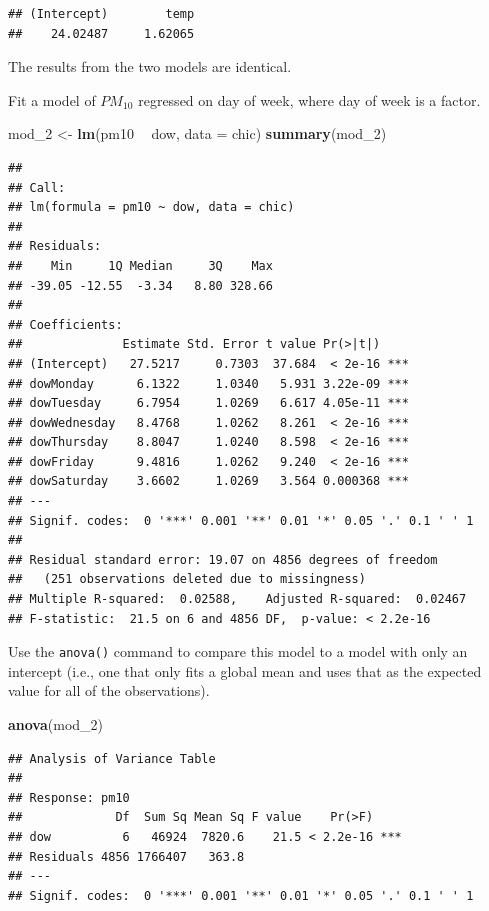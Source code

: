 \documentclass[]{book}
\makeatletter
\newenvironment{Shaded}{\begin{snugshade}}{\end{snugshade}}
\newcommand{\KeywordTok}[1]{\textcolor[rgb]{0.13,0.29,0.53}{\textbf{#1}}}
\newcommand{\DataTypeTok}[1]{\textcolor[rgb]{0.13,0.29,0.53}{#1}}
\newcommand{\DecValTok}[1]{\textcolor[rgb]{0.00,0.00,0.81}{#1}}
\newcommand{\StringTok}[1]{\textcolor[rgb]{0.31,0.60,0.02}{#1}}
\newcommand{\OperatorTok}[1]{\textcolor[rgb]{0.81,0.36,0.00}{\textbf{#1}}}
\newcommand{\NormalTok}[1]{#1}
\newenvironment{kframe}{%
\medskip{}
\setlength{\fboxsep}{.8em}
 \def\at@end@of@kframe{}%
 \ifinner\ifhmode%
  \def\at@end@of@kframe{\end{minipage}}%
  \begin{minipage}{\columnwidth}%
 \fi\fi%
 \def\FrameCommand##1{\hskip\@totalleftmargin \hskip-\fboxsep
 \colorbox{shadecolor}{##1}\hskip-\fboxsep
     \hskip-\linewidth \hskip-\@totalleftmargin \hskip\columnwidth}%
 \MakeFramed {\advance\hsize-\width
   \@totalleftmargin\z@ \linewidth\hsize
   \@setminipage}}%
 {\par\unskip\endMakeFramed%
 \at@end@of@kframe}
\renewenvironment{Shaded}{\begin{kframe}}{\end{kframe}}
\theoremstyle{definition}
\theoremstyle{definition}
\theoremstyle{definition}
\theoremstyle{remark}
\makeatother
\begin{document}
\begin{verbatim}
## (Intercept)        temp 
##    24.02487     1.62065
\end{verbatim}

The results from the two models are identical.

Fit a model of \(PM_{10}\) regressed on day of week, where day of week
is a factor.

\begin{Shaded}
\begin{Highlighting}[]
\NormalTok{mod_}\DecValTok{2}\NormalTok{ <-}\StringTok{ }\KeywordTok{lm}\NormalTok{(pm10 }\OperatorTok{~}\StringTok{ }\NormalTok{dow, }\DataTypeTok{data =}\NormalTok{ chic)}
\KeywordTok{summary}\NormalTok{(mod_}\DecValTok{2}\NormalTok{)}
\end{Highlighting}
\end{Shaded}

\begin{verbatim}
## 
## Call:
## lm(formula = pm10 ~ dow, data = chic)
## 
## Residuals:
##    Min     1Q Median     3Q    Max 
## -39.05 -12.55  -3.34   8.80 328.66 
## 
## Coefficients:
##              Estimate Std. Error t value Pr(>|t|)    
## (Intercept)   27.5217     0.7303  37.684  < 2e-16 ***
## dowMonday      6.1322     1.0340   5.931 3.22e-09 ***
## dowTuesday     6.7954     1.0269   6.617 4.05e-11 ***
## dowWednesday   8.4768     1.0262   8.261  < 2e-16 ***
## dowThursday    8.8047     1.0240   8.598  < 2e-16 ***
## dowFriday      9.4816     1.0262   9.240  < 2e-16 ***
## dowSaturday    3.6602     1.0269   3.564 0.000368 ***
## ---
## Signif. codes:  0 '***' 0.001 '**' 0.01 '*' 0.05 '.' 0.1 ' ' 1
## 
## Residual standard error: 19.07 on 4856 degrees of freedom
##   (251 observations deleted due to missingness)
## Multiple R-squared:  0.02588,    Adjusted R-squared:  0.02467 
## F-statistic:  21.5 on 6 and 4856 DF,  p-value: < 2.2e-16
\end{verbatim}

Use the \texttt{anova()} command to compare this model to a model with
only an intercept (i.e., one that only fits a global mean and uses that
as the expected value for all of the observations).

\begin{Shaded}
\begin{Highlighting}[]
\KeywordTok{anova}\NormalTok{(mod_}\DecValTok{2}\NormalTok{)}
\end{Highlighting}
\end{Shaded}

\begin{verbatim}
## Analysis of Variance Table
## 
## Response: pm10
##             Df  Sum Sq Mean Sq F value    Pr(>F)    
## dow          6   46924  7820.6    21.5 < 2.2e-16 ***
## Residuals 4856 1766407   363.8                      
## ---
## Signif. codes:  0 '***' 0.001 '**' 0.01 '*' 0.05 '.' 0.1 ' ' 1
\end{verbatim}
\end{document}
